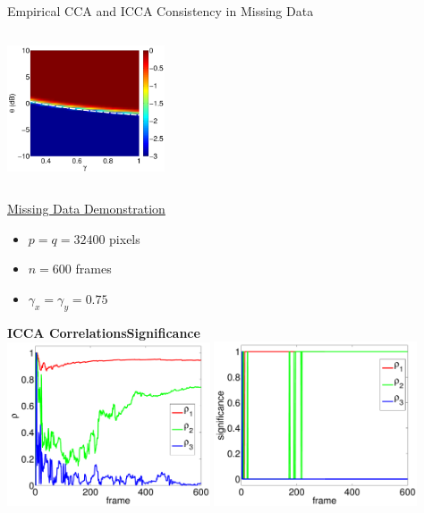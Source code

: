 \documentclass[8pt]{beamer}
\begin{document}
\begin{frame}{Empirical CCA and ICCA Consistency in Missing Data}
\begin{columns}[T]
\begin{column}{1\textwidth}
\begin{center}
        \includegraphics[width=0.35\textwidth]{figures/icca_missing_9_1200.pdf}
      \end{center}
    \end{column}
  \end{columns}

\end{frame}

\begin{frame}{\href{run:/home/asendorf/Documents/thesis_videos/youtube_missing.mp4}{Missing Data
      Demonstration}}

  \begin{itemize}
  \item $p=q=32400$ pixels
  \item $n=600$ frames
  \item $\gamma_x=\gamma_y=0.75$
  \end{itemize}

  \vspace{3ex}

  \begin{center}
    \textbf{ICCA Correlations}\hspace{23ex}\textbf{Significance}\\[0.5ex]
    \includegraphics[width=0.45\textwidth]{figures/icca_corrs_miss.pdf}\hspace{2ex}
    \includegraphics[width=0.45\textwidth]{figures/icca_sigs_miss.pdf}\\[2ex]
  \end{center}

\end{frame}
\end{document}
